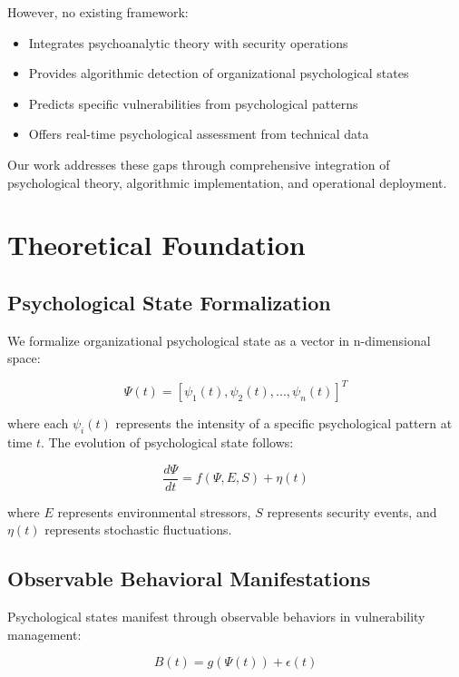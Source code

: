 \documentclass[11pt,a4paper]{article}
\begin{document}
However, no existing framework:
\begin{itemize}
\item Integrates psychoanalytic theory with security operations
\item Provides algorithmic detection of organizational psychological states
\item Predicts specific vulnerabilities from psychological patterns
\item Offers real-time psychological assessment from technical data
\end{itemize}

Our work addresses these gaps through comprehensive integration of psychological theory, algorithmic implementation, and operational deployment.

\section{Theoretical Foundation}

\subsection{Psychological State Formalization}

We formalize organizational psychological state as a vector in n-dimensional space:

\begin{equation}
\Psi(t) = [\psi_1(t), \psi_2(t), ..., \psi_n(t)]^T
\end{equation}

where each $\psi_i(t)$ represents the intensity of a specific psychological pattern at time $t$. The evolution of psychological state follows:

\begin{equation}
\frac{d\Psi}{dt} = f(\Psi, E, S) + \eta(t)
\end{equation}

where $E$ represents environmental stressors, $S$ represents security events, and $\eta(t)$ represents stochastic fluctuations.

\subsection{Observable Behavioral Manifestations}

Psychological states manifest through observable behaviors in vulnerability management:

\begin{equation}
B(t) = g(\Psi(t)) + \epsilon(t)
\end{equation}
\end{document}
